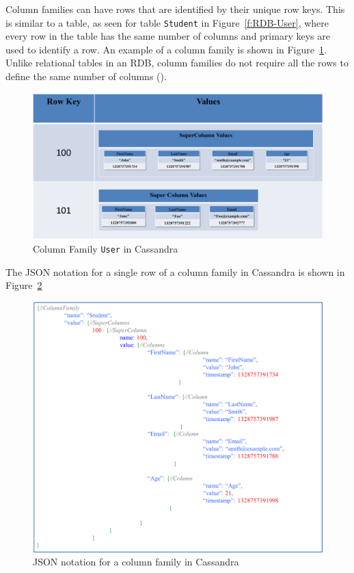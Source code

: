 \begin{description}
Column families can have rows %
that are identified by their unique row keys.  This is similar to a table,   as
seen for table \texttt{Student} in Figure~\ref{f:RDB-User},   where every row in
the table has the same number of columns and primary keys are used to identify a
row.  An example of a column family is shown in Figure~\ref{f:columnfamilyUSER}.
Unlike relational tables in an \ac{RDB},   column families do not require all
the rows to define the same number of columns ().

\begin{figure}[H]
	\centering
	\includegraphics[width=.8\textwidth]{./figure/Example/ColumnFamily-User-DiffColumns.png}
	\caption{Column Family \texttt{User} in Cassandra}\label{f:columnfamilyUSER}
\end{figure}

The JSON notation for a single row of a column family in Cassandra is
shown in Figure~\ref{f:columnfamilyJSON} 

\begin{figure}[H]
	\centering
	\includegraphics[width=.7\textwidth]{./figure/Example/JSON_ColumnFamily_1row.png}
	\caption{JSON notation for a column family in
	Cassandra}\label{f:columnfamilyJSON}
\end{figure}


\end{description}
